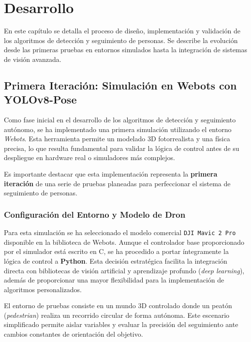 \chapter{\label{desarrollo}Desarrollo}

En este capítulo se detalla el proceso de diseño, implementación y validación de los algoritmos de detección y seguimiento de personas. Se describe la evolución desde las primeras pruebas en entornos simulados hasta la integración de sistemas de visión avanzada.

\section{Primera Iteración: Simulación en Webots con YOLOv8-Pose}
\label{sec:primera_simulacion_webots}

Como fase inicial en el desarrollo de los algoritmos de detección y seguimiento autónomo, se ha implementado una primera simulación utilizando el entorno \textit{Webots}. Esta herramienta permite un modelado 3D fotorrealista y una física precisa, lo que resulta fundamental para validar la lógica de control antes de su despliegue en hardware real o simuladores más complejos.

Es importante destacar que esta implementación representa la \textbf{primera iteración} de una serie de pruebas planeadas para perfeccionar el sistema de seguimiento de personas.

\subsection{Configuración del Entorno y Modelo de Dron}

Para esta simulación se ha seleccionado el modelo comercial \texttt{DJI Mavic 2 Pro} disponible en la biblioteca de Webots. Aunque el controlador base proporcionado por el simulador está escrito en C, se ha procedido a portar íntegramente la lógica de control a \textbf{Python}. Esta decisión estratégica facilita la integración directa con bibliotecas de visión artificial y aprendizaje profundo (\textit{deep learning}), además de proporcionar una mayor flexibilidad para la implementación de algoritmos personalizados.

El entorno de pruebas consiste en un mundo 3D controlado donde un peatón (\textit{pedestrian}) realiza un recorrido circular de forma autónoma. Este escenario simplificado permite aislar variables y evaluar la precisión del seguimiento ante cambios constantes de orientación del objetivo.

